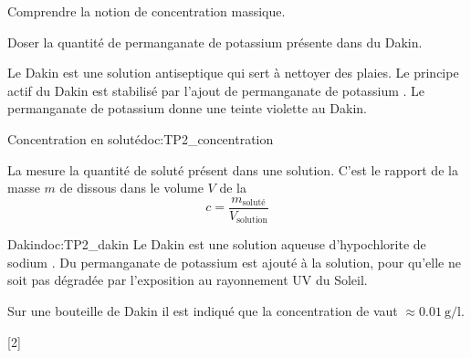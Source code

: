 \teteSndSolu


\vspace*{-36pt}


\begin{objectifs}
  \item Comprendre la notion de concentration massique.
  \item Doser la quantité de permanganate de potassium présente dans du Dakin.
\end{objectifs}


\begin{contexte}
  Le Dakin est une solution antiseptique qui sert à nettoyer des plaies. Le principe actif du Dakin est stabilisé par l'ajout de permanganate de potassium .
  Le permanganate de potassium donne une teinte violette au Dakin.
  
\end{contexte}


\begin{doc}{Concentration en soluté}{doc:TP2_concentration}
  \begin{importants}
    La  mesure la quantité de soluté présent dans une solution.
    C'est le rapport de la masse $m$ de  dissous dans le volume $V$ de la 
    \begin{equation*}
      c = \frac{m_\text{soluté}}{V_\text{solution}}
    \end{equation*}
  \end{importants}
\end{doc}


\begin{doc}{Dakin}{doc:TP2_dakin}
  Le Dakin est une solution aqueuse d'hypochlorite de sodium .
  Du permanganate de potassium  est ajouté à la solution, pour qu'elle ne soit pas dégradée par l'exposition au rayonnement UV du Soleil.
  
  \fleche Sur une bouteille de Dakin il est indiqué que la concentration de  vaut $\approx \qty{0,01}{\g/\litre}$.
\end{doc}

%
[2]



